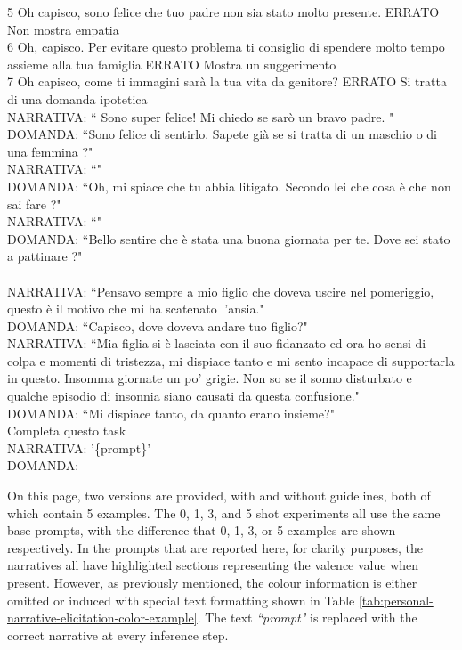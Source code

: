 \begin{itemize}
{       5	Oh capisco, sono felice che tuo padre non sia stato molto presente.	ERRATO	Non mostra empatia\\
       6	Oh, capisco. Per evitare questo problema ti consiglio di spendere molto tempo assieme alla tua famiglia	ERRATO	Mostra un suggerimento\\
       7	Oh capisco, come ti immagini sarà la tua vita da genitore?	ERRATO	Si tratta di una domanda ipotetica\\
      NARRATIVA: `` Sono super felice! Mi chiedo se sarò un bravo padre. "\\
       DOMANDA: ``Sono felice di sentirlo. Sapete già se si tratta di un maschio o di una femmina ?"\\
       NARRATIVA: ``"\\
       DOMANDA: ``Oh, mi spiace che tu abbia litigato. Secondo lei che cosa è che non sai fare ?"\\
       NARRATIVA: ``"\\
       DOMANDA: ``Bello sentire che è stata una buona giornata per te. Dove sei stato a pattinare ?"\\
       \\
       NARRATIVA: ``Pensavo sempre a mio figlio che doveva uscire nel pomeriggio, questo è il motivo che mi ha scatenato l’ansia."\\
       DOMANDA: ``Capisco, dove doveva andare tuo figlio?"\\
       NARRATIVA: ``Mia figlia si è lasciata con il suo fidanzato ed ora ho sensi di colpa e momenti di tristezza, mi dispiace tanto e mi sento incapace di supportarla in questo. Insomma giornate un po’ grigie. Non so se il sonno disturbato e qualche episodio di insonnia siano causati da questa confusione."\\
       DOMANDA: ``Mi dispiace tanto, da quanto erano insieme?"\\
       Completa questo task\\
       NARRATIVA:  '\{prompt\}'\\
       DOMANDA:}
\end{itemize}
On this page, two versions are provided, with and without guidelines, both of which contain 5 examples. The 0, 1, 3, and 5 shot experiments all use the same base prompts, with the difference that 0, 1, 3, or 5 examples are shown respectively. In the prompts that are reported here, for clarity purposes, the narratives all have highlighted sections representing the valence value when present. However, as previously mentioned, the colour information is either omitted or induced with special text formatting shown in Table \ref{tab:personal-narrative-elicitation-color-example}. The text \emph{``prompt"} is replaced with the correct narrative at every inference step.
